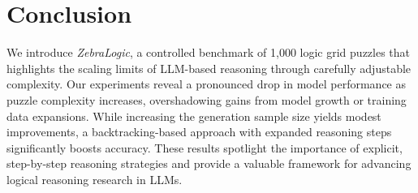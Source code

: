 \section{Conclusion}
\label{sec:conclusion}


We introduce \emph{ZebraLogic}, a controlled benchmark of 1,000 logic grid puzzles that highlights the scaling limits of LLM-based reasoning through carefully adjustable complexity. Our experiments reveal a pronounced drop in model performance as puzzle complexity increases, overshadowing gains from model growth or training data expansions. While increasing the generation sample size yields modest improvements, a backtracking-based approach with expanded reasoning steps significantly boosts accuracy. These results spotlight the importance of explicit, step-by-step reasoning strategies and provide a valuable framework for advancing logical reasoning research in LLMs.

